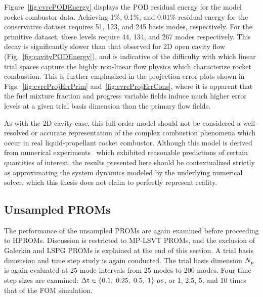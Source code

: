 Figure~\ref{fig:cvrcPODEnergy} displays the POD residual energy for the model rocket combustor data. Achieving 1\%, 0.1\%, and 0.01\% residual energy for the conservative dataset requires 51, 123, and 245 basis modes, respectively. For the primitive dataset, these levels require 44, 134, and 267 modes respectively. This decay is significantly slower than that observed for 2D open cavity flow (Fig.~\ref{fig:cavityPODEnergy}), and is indicative of the difficulty with which linear trial spaces capture the highly non-linear flow physics which characterize rocket combustion. This is further emphasized in the projection error plots shown in Figs.~\ref{fig:cvrcProjErrPrim} and~\ref{fig:cvrcProjErrCons}, where it is apparent that the fuel mixture fraction and progress variable fields induce much higher error levels at a given trial basis dimension than the primary flow fields.

As with the 2D cavity case, this full-order model should not be considered a well-resolved or accurate representation of the complex combustion phenomena which occur in real liquid-propellant rocket combustor. Although this model is derived from numerical experiments~\cite{HarvazinskiCVRCOrig} which exhibited reasonable predictions of certain quantities of interest, the results presented here should be contextualized strictly as approximating the system dynamics modeled by the underlying numerical solver, which this thesis does not claim to perfectly represent reality.

\subsection{Unsampled PROMs}

The performance of the unsampled PROMs are again examined before proceeding to HPROMs. Discussion is restricted to MP-LSVT PROMs, and the exclusion of Galerkin and LSPG PROMs is explained at the end of this section. A trial basis dimension and time step study is again conducted. The trial basis dimension $N_p$ is again evaluated at 25-mode intervals from 25 modes to 200 modes. Four time step sizes are examined: $\Delta \text{t} \in \{ 0.1, \; 0.25, \; 0.5, \; 1 \} \; \mu \text{s}$, or 1, 2.5, 5, and 10 times that of the FOM simulation.

